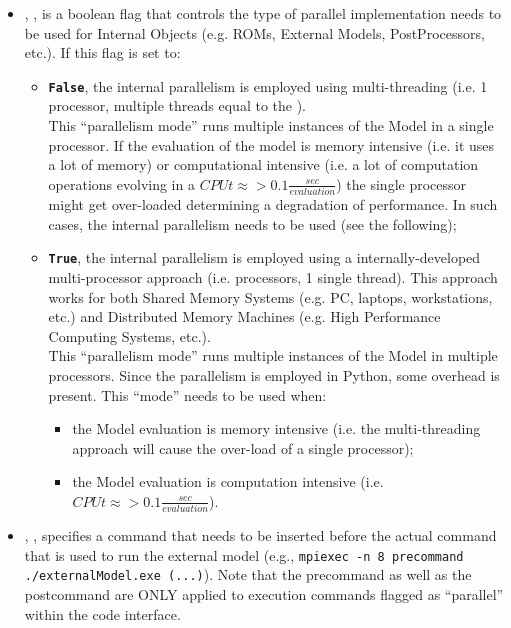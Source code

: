 \begin{itemize}
\item {}, , is a boolean
flag that controls the type of parallel implementation needs to be used for Internal
Objects (e.g. ROMs, External Models, PostProcessors, etc.).
If this flag is set to:
\begin{itemize}
 \item  \textbf{\texttt{False}}, the internal parallelism is employed using multi-threading (i.e. 1 processor, multiple threads equal to the ).
\\\nb This ``parallelism mode'' runs multiple instances of the Model in a single processor. If the evaluation of the model is memory intensive (i.e. it uses a lot of memory) or computational intensive (i.e. a lot of computation operations evolving in a $CPUt  \approx >  0.1\frac{sec}{evaluation}$) the single processor might get over-loaded determining a degradation of performance. In such cases, the internal parallelism needs to be used (see the following);
 \item  \textbf{\texttt{True}}, the internal parallelism is employed using a internally-developed multi-processor approach (i.e.  processors, 1 single thread). This approach works for both Shared Memory Systems (e.g. PC, laptops, workstations, etc.) and Distributed Memory Machines (e.g. High Performance Computing Systems, etc.).
 \\\nb This ``parallelism mode'' runs multiple instances of the Model in multiple processors. Since the parallelism is employed
 in Python, some overhead is present. This ``mode'' needs to be used when:
 \begin{itemize}
  \item the Model evaluation is memory intensive (i.e. the multi-threading approach will cause the over-load of a single processor);
  \item the Model evaluation is computation intensive (i.e. $CPUt  \approx >  0.1\frac{sec}{evaluation}$).
 \end{itemize}
\end{itemize}
%



\item {}, , specifies
a command that needs to be inserted before the actual command that is used to
run the external model (e.g., \texttt{mpiexec -n 8 precommand
./externalModel.exe (...)}).
Note that the precommand as well as the postcommand are ONLY applied to
execution commands flagged as ``parallel'' within the code interface.
%


\end{itemize}
